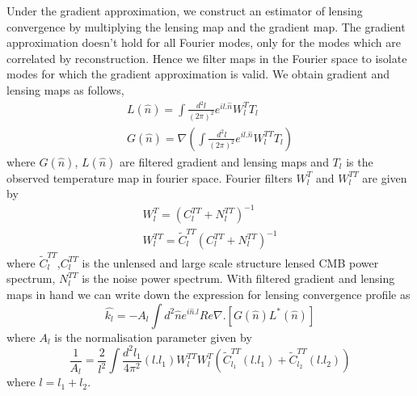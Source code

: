  Under the gradient approximation, we construct an estimator of lensing convergence by multiplying the lensing map and the gradient map.
The gradient approximation doesn't hold for all Fourier modes, only for the modes which are correlated by reconstruction.
Hence we filter maps in the Fourier space to isolate modes for which the gradient approximation is valid.
 We obtain gradient and lensing maps as follows,
  \begin{eqnarray}
  L(\hat{n}) = \int \frac{d^{2}l}{(2\pi)^{2}} e^{il .\hat{n}} W^{T}_{l} T_{l}\\
  G(\hat{n}) = \nabla (\int\frac{d^{2}l}{(2\pi)^{2}} e^{il .\hat{n}} W^{TT}_{l} T_{l}   )
  \end{eqnarray}
  where $G(\hat{n})$, $L(\hat{n})$ are filtered gradient and lensing maps and $T_{l}$ is the observed temperature map in fourier space.  
 Fourier filters $W^{T}_{l}$ and $W^{TT}_{l}$ are given by 
 \begin{eqnarray}
 W^{T}_{l} = (C^{TT}_{l} + N^{TT}_{l})^{-1}\\
 W^{TT}_{l} =  \widetilde{C}^{TT}_{l}(C^{TT}_{l} + N^{TT}_{l})^{-1}
 \end{eqnarray}
 where  $\widetilde{C}^{TT}_{l}$,$C^{TT}_{l} $  is the unlensed and large scale structure lensed CMB power spectrum, $ N^{TT}_{l}$ is the noise power spectrum.
 With filtered gradient and lensing maps in hand we can write down the expression for lensing convergence profile as 
 \begin{equation}
 \hat{k_{l}} = -A_{l} \int d^{2} \hat{n} e^{i\hat{n}.l} Re{\nabla .[G(\hat{n}) L^{*}(\hat{n})]}
 \end{equation}
 where $A_{l}$ is the normalisation parameter given by
 \begin{equation}
 \frac{1}{A_{l}} = \frac{2}{l^{2}} \int \frac{d^{2}l_{1}}{4\pi^{2}} (l.l_{1}) W^{TT}_{l} W^{T}_{l} (\tilde{C}^{TT}_{l_{1}}(l.l_{1}) + \tilde{C}^{TT}_{l_{2}}(l.l_{2}))
 \end{equation}
 where $l = l_{1}  + l_{2}$. 
